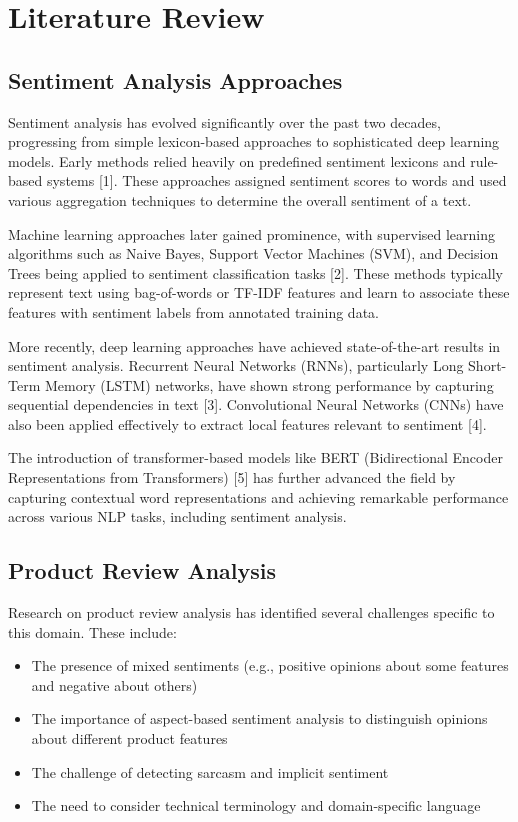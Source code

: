 \documentclass[
]{article}
\providecommand{\tightlist}{%
  \setlength{\itemsep}{0pt}\setlength{\parskip}{0pt}}\usepackage{longtable,booktabs,array}
\begin{document}
\section{Literature Review}\label{literature-review}

\subsection{Sentiment Analysis
Approaches}\label{sentiment-analysis-approaches}

Sentiment analysis has evolved significantly over the past two decades,
progressing from simple lexicon-based approaches to sophisticated deep
learning models. Early methods relied heavily on predefined sentiment
lexicons and rule-based systems {[}1{]}. These approaches assigned
sentiment scores to words and used various aggregation techniques to
determine the overall sentiment of a text.

Machine learning approaches later gained prominence, with supervised
learning algorithms such as Naive Bayes, Support Vector Machines (SVM),
and Decision Trees being applied to sentiment classification tasks
{[}2{]}. These methods typically represent text using bag-of-words or
TF-IDF features and learn to associate these features with sentiment
labels from annotated training data.

More recently, deep learning approaches have achieved state-of-the-art
results in sentiment analysis. Recurrent Neural Networks (RNNs),
particularly Long Short-Term Memory (LSTM) networks, have shown strong
performance by capturing sequential dependencies in text {[}3{]}.
Convolutional Neural Networks (CNNs) have also been applied effectively
to extract local features relevant to sentiment {[}4{]}.

The introduction of transformer-based models like BERT (Bidirectional
Encoder Representations from Transformers) {[}5{]} has further advanced
the field by capturing contextual word representations and achieving
remarkable performance across various NLP tasks, including sentiment
analysis.

\subsection{Product Review Analysis}\label{product-review-analysis}

Research on product review analysis has identified several challenges
specific to this domain. These include:

\begin{itemize}
\tightlist
\item
  The presence of mixed sentiments (e.g., positive opinions about some
  features and negative about others)
\item
  The importance of aspect-based sentiment analysis to distinguish
  opinions about different product features
\item
  The challenge of detecting sarcasm and implicit sentiment
\item
  The need to consider technical terminology and domain-specific
  language
\end{itemize}
\end{document}
